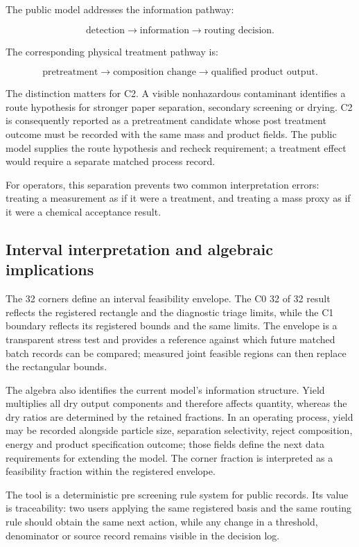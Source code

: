 \documentclass[pdflatex,sn-basic]{sn-jnl}
\begin{document}
The public model addresses the information pathway:

\[
\text{detection}\rightarrow\text{information}\rightarrow\text{routing decision}.
\]

The corresponding physical treatment pathway is:

\[
\text{pretreatment}\rightarrow\text{composition change}\rightarrow\text{qualified product output}.
\]

The distinction matters for C2. A visible nonhazardous contaminant identifies a route hypothesis for stronger paper separation, secondary screening or drying. C2 is consequently reported as a pretreatment candidate whose post treatment outcome must be recorded with the same mass and product fields. The public model supplies the route hypothesis and recheck requirement; a treatment effect would require a separate matched process record.

For operators, this separation prevents two common interpretation errors: treating a measurement as if it were a treatment, and treating a mass proxy as if it were a chemical acceptance result.

\subsection{Interval interpretation and algebraic implications}\label{interval-interpretation-and-algebraic-implications}

The 32 corners define an interval feasibility envelope. The C0 32 of 32 result reflects the registered rectangle and the diagnostic triage limits, while the C1 boundary reflects its registered bounds and the same limits. The envelope is a transparent stress test and provides a reference against which future matched batch records can be compared; measured joint feasible regions can then replace the rectangular bounds.

The algebra also identifies the current model's information structure. Yield multiplies all dry output components and therefore affects quantity, whereas the dry ratios are determined by the retained fractions. In an operating process, yield may be recorded alongside particle size, separation selectivity, reject composition, energy and product specification outcome; those fields define the next data requirements for extending the model. The corner fraction is interpreted as a feasibility fraction within the registered envelope.

The tool is a deterministic pre screening rule system for public records. Its value is traceability: two users applying the same registered basis and the same routing rule should obtain the same next action, while any change in a threshold, denominator or source record remains visible in the decision log.
\end{document}
